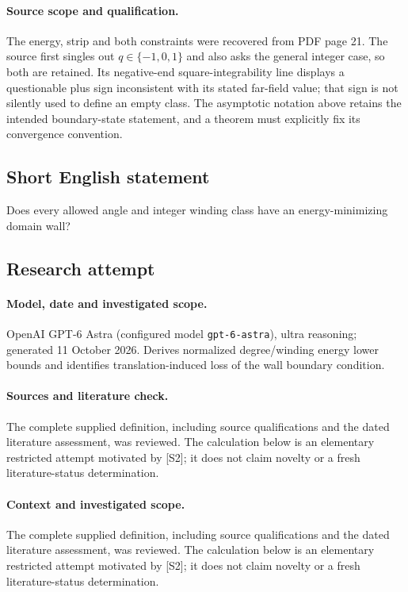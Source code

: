 \documentclass[11pt]{article}
\begin{document}
\paragraph{Source scope and qualification.}
The energy, strip and both constraints were recovered from PDF page 21. The source first singles out $q\in\{-1,0,1\}$ and also asks the general integer case, so both are retained. Its negative-end square-integrability line displays a questionable plus sign inconsistent with its stated far-field value; that sign is not silently used to define an empty class. The asymptotic notation above retains the intended boundary-state statement, and a theorem must explicitly fix its convergence convention.
\subsection{Short English statement}
Does every allowed angle and integer winding class have an energy-minimizing domain wall?
\subsection{Research attempt}
\paragraph{Model, date and investigated scope.}
OpenAI GPT-6 Astra (configured model \texttt{gpt-6-astra}), ultra reasoning; generated 11 October 2026. Derives normalized degree/winding energy lower bounds and identifies translation-induced loss of the wall boundary condition.

\paragraph{Sources and literature check.}
The complete supplied definition, including source qualifications and the dated literature assessment, was reviewed. The calculation below is an elementary restricted attempt motivated by [S2]; it does not claim novelty or a fresh literature-status determination.

\paragraph{Context and investigated scope.} The complete supplied definition, including source qualifications and the dated literature assessment, was reviewed. The calculation below is an elementary restricted attempt motivated by [S2]; it does not claim novelty or a fresh literature-status determination.
\end{document}
